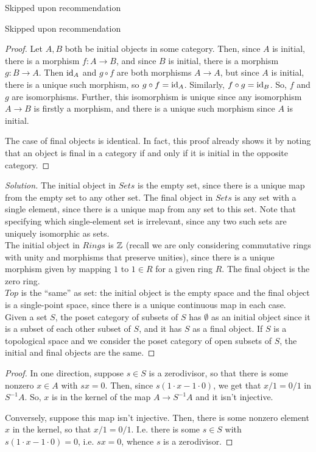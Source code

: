 \documentclass[12pt]{exam}
\begin{document}
 Skipped upon recommendation

 Skipped upon recommendation

\begin{proof}
	Let $A,B$ both be initial objects in some category. Then, since $A$ is initial, there is a morphism $f : A \to B$, and since $B$ is initial, there is a morphism $g : B \to A$. Then $\operatorname{id}_A$ and $g \circ f$ are both morphisms $A \to A$, but since $A$ is initial, there is a unique such morphism, so $g \circ f = \operatorname{id}_A$. Similarly, $f \circ g = \operatorname{id}_B$. So, $f$ and $g$ are isomorphisms. Further, this isomorphism is unique since any isomorphism $A \to B$ is firstly a morphism, and there is a unique such morphism since $A$ is initial.
	
	The case of final objects is identical. In fact, this proof already shows it by noting that an object is final in a category if and only if it is initial in the opposite category.
\end{proof}

\begin{proof}[Solution]
	The initial object in $Sets$ is the empty set, since there is a unique map from the empty set to any other set. The final object in $Sets$ is any set with a single element, since there is a unique map from any set to this set. Note that specifying which single-element set is irrelevant, since any two such sets are uniquely isomorphic as sets. \\
	
	The initial object in $Rings$ is $\mathbb{Z}$ (recall we are only considering commutative rings with unity and morphisms that preserve unities), since there is a unique morphism given by mapping $1$ to $1 \in R$ for a given ring $R$. The final object is the zero ring. \\
	
	$Top$ is the ``same'' as set: the initial object is the empty space and the final object is a single-point space, since there is a unique continuous map in each case. \\
	
	Given a set $S$, the poset category of subsets of $S$ has $\emptyset$ as an initial object since it is a subset of each other subset of $S$, and it has $S$ as a final object. If $S$ is a topological space and we consider the poset category of open subsets of $S$, the initial and final objects are the same.
\end{proof}

\begin{proof}
	In one direction, suppose $s \in S$ is a zerodivisor, so that there is some nonzero $x \in A$ with $sx = 0$. Then, since $s(1 \cdot x - 1 \cdot 0)$, we get that $x/1 = 0/1$ in $S^{-1}A$. So, $x$ is in the kernel of the map $A \to S^{-1}A$ and it isn't injective.
	
	Conversely, suppose this map isn't injective. Then, there is some nonzero element $x$ in the kernel, so that $x/1 = 0/1$. I.e. there is some $s \in S$ with $s(1 \cdot x - 1 \cdot 0) = 0$, i.e. $sx = 0$, whence $s$ is a zerodivisor.
\end{proof}
\end{document}
